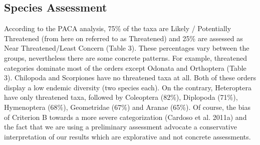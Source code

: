     \subsection{Species Assessment}
    \label{subsec:arthropods-species-assessment}
    
According to the PACA analysis, 75\% of the taxa are Likely / Potentially
Threatened (from here on referred to as Threatened) and 25\% are assessed as
Near Threatened/Least Concern (Table 3). These percentages vary between the groups,
nevertheless there are some concrete patterns. For example, threatened
categories dominate most of the orders except Odonata and Orthoptera (Table 3).
Chilopoda and Scorpiones have no threatened taxa at all. Both of these orders
display a low endemic diversity (two species each). On the contrary,
Heteroptera have only threatened taxa, followed by Coleoptera (82\%),
Diplopoda (71\%), Hymenoptera (68\%), Geometridae (67\%) and Aranae (65\%).
Of course, the bias of Criterion B towards a more severe categorization
(Cardoso et al. 2011a) and the fact that we are using a preliminary assessment
advocate a conservative interpretation of our results which are explorative and not concrete assessments.


